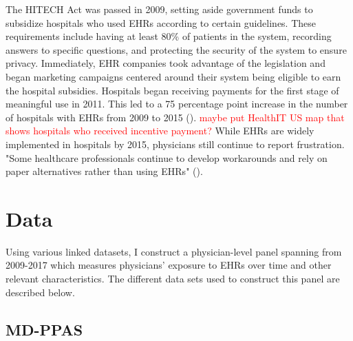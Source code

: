 \documentclass[11pt]{article}
\begin{document}
The HITECH Act was passed in 2009, setting aside government funds to subsidize hospitals who used EHRs according to certain guidelines. These requirements include having at least 80\% of patients in the system, recording answers to specific questions, and protecting the security of the system to ensure privacy. Immediately, EHR companies took advantage of the legislation and began marketing campaigns centered around their system being eligible to earn the hospital subsidies. Hospitals began receiving payments for the first stage of meaningful use in 2011. This led to a 75 percentage point increase in the number of hospitals with EHRs from 2009 to 2015 (\cite{stats}). \textcolor{red}{maybe put HealthIT US map that shows hospitals who received incentive payment?} While EHRs are widely implemented in hospitals by 2015, physicians still continue to report frustration. "Some healthcare professionals continue to develop workarounds and rely on paper alternatives rather than using EHRs" (\cite{evans2016electronic}).  

\section{Data}

Using various linked datasets, I construct a physician-level panel spanning from 2009-2017 which measures physicians' exposure to EHRs over time and other relevant characteristics. The different data sets used to construct this panel are described below.

\subsection{MD-PPAS}
\end{document}
